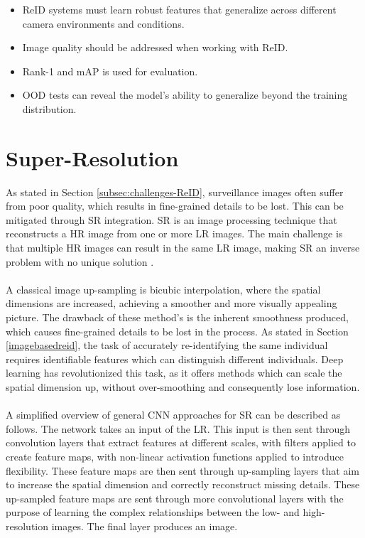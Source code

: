 \begin{itemize}
    \item \acs{ReID} systems must learn robust features that generalize across different camera environments and conditions.
    \item Image quality should be addressed when working with \acs{ReID}.
    \item Rank-1 and \acs{mAP} is used for evaluation. 
    \item \acs{OOD} tests can reveal the model's ability to generalize beyond the training distribution. 
\end{itemize}

\section{Super-Resolution}
\label{sec:SuperResolution}
As stated in Section \ref{subsec:challenges-ReID}, surveillance images often suffer from poor quality, which results in fine-grained details to be lost. This can be mitigated through \acf{SR} integration. \acs{SR} is an image processing technique that reconstructs a \acf{HR} image from one or more \acf{LR} images. The main challenge is that multiple \acs{HR} images can result in the same \acs{LR} image, making \acs{SR} an inverse problem with no unique solution \cite{srhallucination}.
\\\\
A classical image up-sampling is bicubic interpolation, where the spatial dimensions are increased, achieving a smoother and more visually appealing picture. The drawback of these method's is the inherent smoothness produced, which causes fine-grained details to be lost in the process. As stated in Section \ref{imagebasedreid}, the task of accurately re-identifying the same individual requires identifiable features which can distinguish different individuals. Deep learning has revolutionized this task, as it offers methods which can scale the spatial dimension up, without over-smoothing and consequently lose information. 
\\\\
A simplified overview of general \acs{CNN} approaches for \acs{SR} can be described as follows. The network takes an input of the \acs{LR}. This input is then sent through convolution layers that extract features at different scales, with filters applied to create feature maps, with non-linear activation functions applied to introduce flexibility.  These feature maps are then sent through up-sampling layers that aim to increase the spatial dimension and correctly reconstruct missing details. These up-sampled feature maps are sent through more convolutional layers with the purpose of learning the complex relationships between the low- and high-resolution images. The final layer produces an image.

